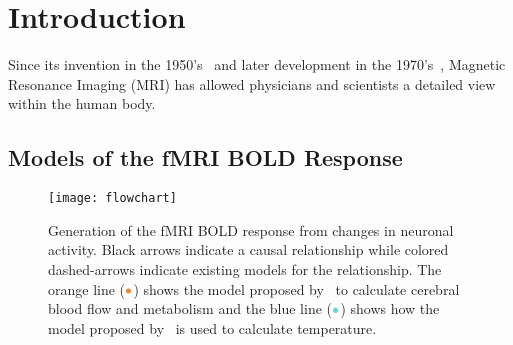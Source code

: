 \chapter{Introduction}
\label{ch:introduction}



Since its invention in the 1950's~\citep{carr1954} and later development in the 1970's~\citep{lauterbur1973}, {M}agnetic {R}esonance {I}maging ({MRI}) has allowed physicians and scientists a detailed view within the human body.
  
  \section{Models of the fMRI BOLD Response}
  \label{sec:BOLDmodeling}
  
  \begin{figure}[bt]
    \centering
    \vspace{10pt}
    \texttt{[image: flowchart]}
    \caption[Generation of the fMRI BOLD response and a corresponding temperature change]{\label{fig:flowchart} Generation of the fMRI BOLD response from changes in neuronal activity.  Black arrows indicate a causal relationship while colored dashed-arrows indicate existing models for the relationship.  The orange line ($\color{goldfish}\bullet$) shows the model proposed by~\citet{sotero2011} to calculate cerebral blood flow and metabolism and the blue line ($\color{aoi}\bullet$) shows how the model proposed by~\citet{collins} is used to calculate temperature.}
  \end{figure}
